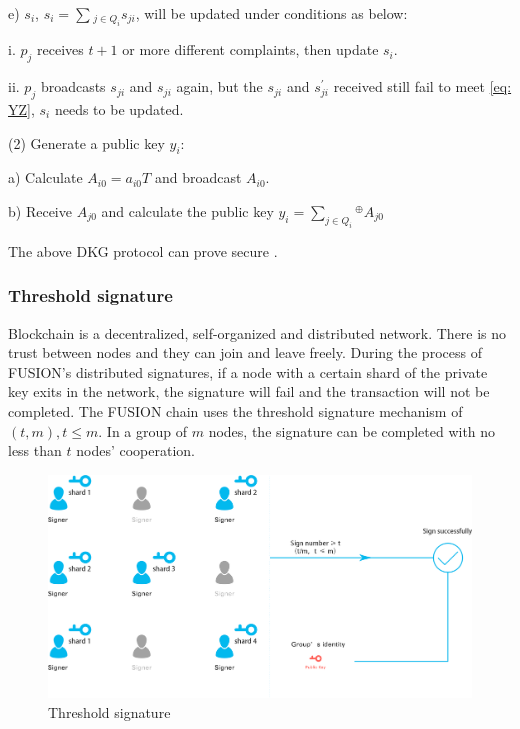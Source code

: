 \documentclass[a4paper,12pt]{article}
\begin{document}
e) $s_i$,  ${s_i} = \sum \limits _{} ^{}{_{j \in{Q_i} }{s_{ji}}}$, will be updated under conditions as below:

i. $p_j$ receives $t + 1$ or more different complaints, then update $s_i$.

ii. $p_j$ broadcasts $ s_{ji}$ and ${s_{ji}}$ again, but the $ s_{ji}$ and $s_{ji}^{'}$ received still fail to meet \ref{eq: YZ}, $s_i$ needs to be updated.

(2) Generate a public key $y_i$:

a) Calculate $A_{i0} = a_{i0}T$ and broadcast $A_{i0}$.

b) Receive $A_{j0}$ and calculate the public key ${y_i} = \sum \limits_{j \in{Q_i}} ^{}{^ \oplus}{A_{j0}}$

The above DKG protocol can prove secure \citep{Gennaro1999}.

\subsubsection{Threshold signature}

Blockchain is a decentralized, self-organized and distributed network. There is no trust between nodes and they can join and leave freely. During the process of FUSION's distributed signatures, if a node with a certain shard of the private key exits in the network, the signature will fail and the transaction will not be completed. The FUSION chain uses the threshold signature mechanism \citep{Shamir1979} of $\left(t, m \right), t \le m$. In a group of $m$ nodes, the signature can be completed with no less than $t$ nodes' cooperation.

\begin{figure} [htbp]
\centering \includegraphics [width = 5in]{pic/thresholdsign.png}
\caption{Threshold signature} \label{fig: 1}
\end{figure}
\end{document}
